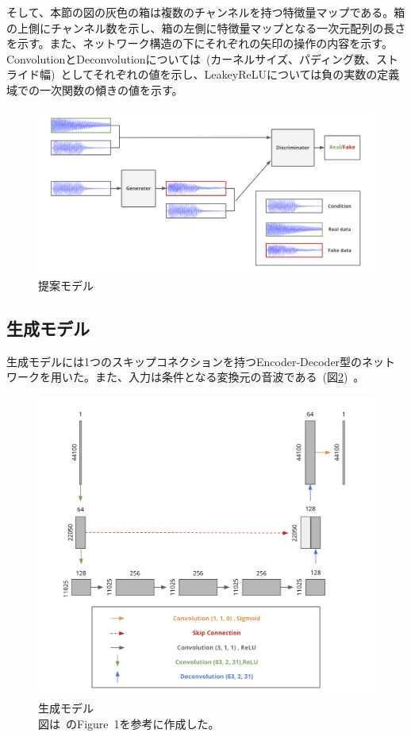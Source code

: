 そして、本節の図の灰色の箱は複数のチャンネルを持つ特徴量マップである。箱の上側にチャンネル数を示し、箱の左側に特徴量マップとなる一次元配列の長さを示す。また、ネットワーク構造の下にそれぞれの矢印の操作の内容を示す。ConvolutionとDeconvolutionについては~(カーネルサイズ、パディング数、ストライド幅)~としてそれぞれの値を示し、LeakeyReLUについては負の実数の定義域での一次関数の傾きの値を示す。

\begin{figure}[t]
\begin{center}
\includegraphics[width=0.8\hsize]{figure/pr_model.png}
\caption{提案モデル}
\label{fig:pr_model}
\end{center}
\end{figure}

\subsection{生成モデル}

生成モデルには1つのスキップコネクションを持つEncoder-Decoder型のネットワークを用いた。また、入力は条件となる変換元の音波である~(図\ref{fig:pr_gen})~。

\begin{figure}[b]
\begin{center}
\includegraphics[width=0.6\hsize]{figure/pr_generator.png}
\caption{生成モデル\\
図は~\cite{u-net}のFigure~1を参考に作成した。}
\label{fig:pr_gen}
\end{center}
\end{figure}

